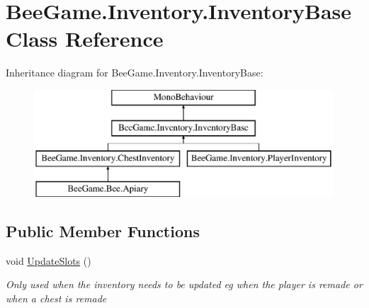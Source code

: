 \hypertarget{class_bee_game_1_1_inventory_1_1_inventory_base}{}\section{Bee\+Game.\+Inventory.\+Inventory\+Base Class Reference}
\label{class_bee_game_1_1_inventory_1_1_inventory_base}
Inheritance diagram for Bee\+Game.\+Inventory.\+Inventory\+Base\+:\begin{figure}[H]
\begin{center}
\leavevmode
\includegraphics[height=4.000000cm]{class_bee_game_1_1_inventory_1_1_inventory_base}
\end{center}
\end{figure}
\subsection*{Public Member Functions}
\begin{DoxyCompactItemize}
\item 
void \hyperlink{class_bee_game_1_1_inventory_1_1_inventory_base_ac8edbffe8b164d66297c127654c844c4}{Update\+Slots} ()
\begin{DoxyCompactList}\small\item\em Only used when the inventory needs to be updated eg when the player is remade or when a chest is remade \end{DoxyCompactList}\end{DoxyCompactItemize}
